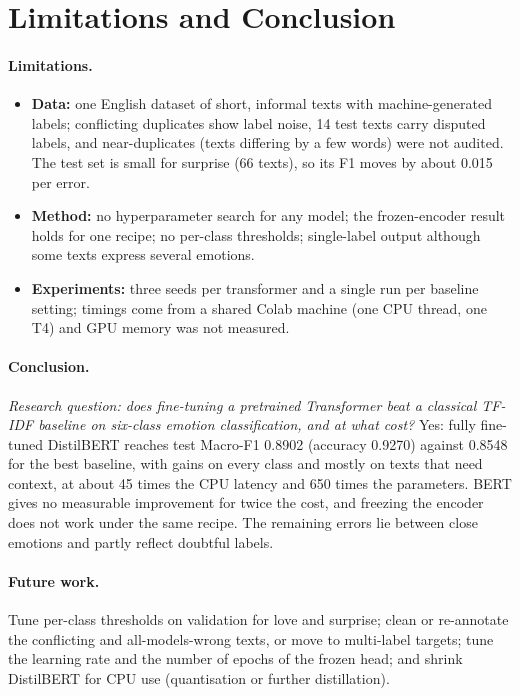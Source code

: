 \documentclass[11pt,a4paper]{article}
\begin{document}
\section{Limitations and Conclusion}
\paragraph{Limitations.}
\begin{itemize}
  \item \textbf{Data:} one English dataset of short, informal texts with machine-generated labels; conflicting duplicates show label noise, 14 test texts carry disputed labels, and near-duplicates (texts differing by a few words) were not audited. The test set is small for surprise (66 texts), so its F1 moves by about 0.015 per error.
  \item \textbf{Method:} no hyperparameter search for any model; the frozen-encoder result holds for one recipe; no per-class thresholds; single-label output although some texts express several emotions.
  \item \textbf{Experiments:} three seeds per transformer and a single run per baseline setting; timings come from a shared Colab machine (one CPU thread, one T4) and GPU memory was not measured.
\end{itemize}

\paragraph{Conclusion.} \emph{Research question: does fine-tuning a pretrained Transformer beat a classical TF-IDF baseline on six-class emotion classification, and at what cost?} Yes: fully fine-tuned DistilBERT reaches test Macro-F1 0.8902 (accuracy 0.9270) against 0.8548 for the best baseline, with gains on every class and mostly on texts that need context, at about 45 times the CPU latency and 650 times the parameters. BERT gives no measurable improvement for twice the cost, and freezing the encoder does not work under the same recipe. The remaining errors lie between close emotions and partly reflect doubtful labels.

\paragraph{Future work.} Tune per-class thresholds on validation for love and surprise; clean or re-annotate the conflicting and all-models-wrong texts, or move to multi-label targets; tune the learning rate and the number of epochs of the frozen head; and shrink DistilBERT for CPU use (quantisation or further distillation).
\end{document}
